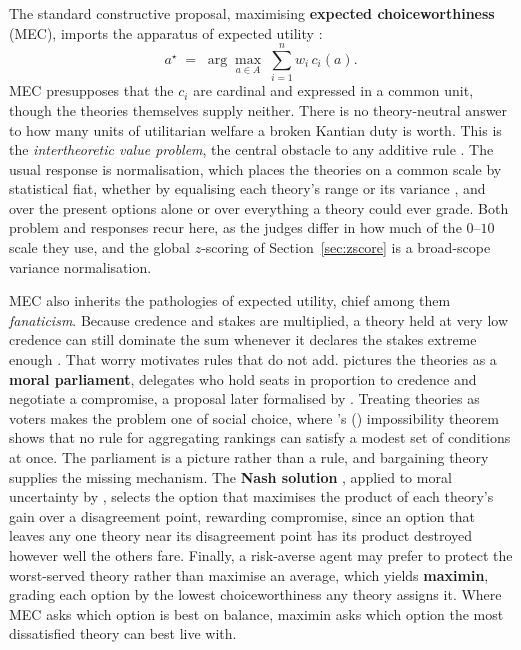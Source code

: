 \documentclass[10pt,twocolumn,a4paper]{article}
\let\cite\citep
\begin{document}
The standard constructive proposal, maximising \textbf{expected
choiceworthiness} (MEC), imports the apparatus of expected utility
\cite{lockhart2000,macaskill2020}:
\[
  a^{\star} \;=\; \arg\max_{a \in A}\; \sum_{i=1}^{n} w_i\, c_i(a).
\]
MEC presupposes that the $c_i$ are cardinal and expressed in a common unit,
though the theories themselves supply neither. There is no theory-neutral answer
to how many units of utilitarian welfare a broken Kantian duty is worth.
This is the \emph{intertheoretic value problem}, the central obstacle to
any additive rule \cite{macaskill2020}. The usual response is
normalisation, which places the theories on a common scale by statistical
fiat, whether by equalising each theory's range \cite{lockhart2000} or
its variance \cite{cottonbarratt2020}, and over the present options alone
or over everything a theory could ever grade. Both problem and responses
recur here, as the judges differ in how much of the $0$--$10$ scale they
use, and the global $z$-scoring of Section~\ref{sec:zscore} is a
broad-scope variance normalisation.

MEC also inherits the pathologies of expected utility, chief among them
\emph{fanaticism}. Because credence and stakes are multiplied, a theory
held at very low credence can still dominate the sum whenever it
declares the stakes extreme enough \cite{macaskill2020}. That worry
motivates rules that do not add. \citet{bostrom2009} pictures the
theories as a \textbf{moral parliament}, delegates who hold seats in
proportion to credence and negotiate a compromise, a proposal later
formalised by \citet{newberry2021}. Treating theories as voters makes
the problem one of social choice, where \citeauthor{arrow1951}'s
(\citeyear{arrow1951}) impossibility theorem shows that no rule for
aggregating rankings can satisfy a modest set of conditions at once. The
parliament is a picture rather
than a rule, and bargaining theory supplies the missing mechanism. The
\textbf{Nash solution} \cite{nash1950}, applied to moral uncertainty by
\citet{greaves2019}, selects the option that maximises the product of
each theory's gain over a disagreement point, rewarding compromise,
since an option that leaves any one theory near its disagreement point
has its product destroyed however well the others fare. Finally, a
risk-averse agent may prefer to protect the worst-served
theory rather than maximise an average, which yields \textbf{maximin},
grading each option by the lowest choiceworthiness any theory assigns
it. Where MEC asks which option is best on balance, maximin asks which
option the most dissatisfied theory can best live with.
\end{document}
